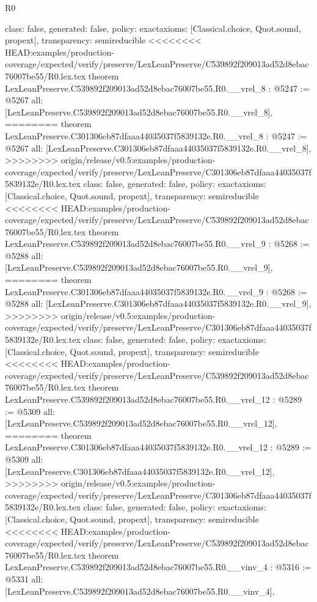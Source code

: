 \begin{lexlean}{R0}
\begin{coremodule}
{{{{{{{{{{{{{{{{{{{{{{{{{{{{{{{{{{{{{{{{{{{{{{{{{{{{{{{{{{{{{{{{{{{{{{{  class: false,
  generated: false,
  policy: exact{axioms: [Classical.choice, Quot.sound, propext]},
  transparency: semireducible
}
<<<<<<<< HEAD:examples/production-coverage/expected/verify/preserve/LexLeanPreserve/C539892f209013ad52d8ebac76007be55/R0.lex.tex
theorem LexLeanPreserve.C539892f209013ad52d8ebac76007be55.R0.__vrel_8 : @5247 := @5267 {
  all: [LexLeanPreserve.C539892f209013ad52d8ebac76007be55.R0.__vrel_8],
========
theorem LexLeanPreserve.C301306eb87dfaaa44035037f5839132e.R0.__vrel_8 : @5247 := @5267 {
  all: [LexLeanPreserve.C301306eb87dfaaa44035037f5839132e.R0.__vrel_8],
>>>>>>>> origin/release/v0.5:examples/production-coverage/expected/verify/preserve/LexLeanPreserve/C301306eb87dfaaa44035037f5839132e/R0.lex.tex
  class: false,
  generated: false,
  policy: exact{axioms: [Classical.choice, Quot.sound, propext]},
  transparency: semireducible
}
<<<<<<<< HEAD:examples/production-coverage/expected/verify/preserve/LexLeanPreserve/C539892f209013ad52d8ebac76007be55/R0.lex.tex
theorem LexLeanPreserve.C539892f209013ad52d8ebac76007be55.R0.__vrel_9 : @5268 := @5288 {
  all: [LexLeanPreserve.C539892f209013ad52d8ebac76007be55.R0.__vrel_9],
========
theorem LexLeanPreserve.C301306eb87dfaaa44035037f5839132e.R0.__vrel_9 : @5268 := @5288 {
  all: [LexLeanPreserve.C301306eb87dfaaa44035037f5839132e.R0.__vrel_9],
>>>>>>>> origin/release/v0.5:examples/production-coverage/expected/verify/preserve/LexLeanPreserve/C301306eb87dfaaa44035037f5839132e/R0.lex.tex
  class: false,
  generated: false,
  policy: exact{axioms: [Classical.choice, Quot.sound, propext]},
  transparency: semireducible
}
<<<<<<<< HEAD:examples/production-coverage/expected/verify/preserve/LexLeanPreserve/C539892f209013ad52d8ebac76007be55/R0.lex.tex
theorem LexLeanPreserve.C539892f209013ad52d8ebac76007be55.R0.__vrel_12 : @5289 := @5309 {
  all: [LexLeanPreserve.C539892f209013ad52d8ebac76007be55.R0.__vrel_12],
========
theorem LexLeanPreserve.C301306eb87dfaaa44035037f5839132e.R0.__vrel_12 : @5289 := @5309 {
  all: [LexLeanPreserve.C301306eb87dfaaa44035037f5839132e.R0.__vrel_12],
>>>>>>>> origin/release/v0.5:examples/production-coverage/expected/verify/preserve/LexLeanPreserve/C301306eb87dfaaa44035037f5839132e/R0.lex.tex
  class: false,
  generated: false,
  policy: exact{axioms: [Classical.choice, Quot.sound, propext]},
  transparency: semireducible
}
<<<<<<<< HEAD:examples/production-coverage/expected/verify/preserve/LexLeanPreserve/C539892f209013ad52d8ebac76007be55/R0.lex.tex
theorem LexLeanPreserve.C539892f209013ad52d8ebac76007be55.R0.__vinv_4 : @5316 := @5331 {
  all: [LexLeanPreserve.C539892f209013ad52d8ebac76007be55.R0.__vinv_4],
}}}}}}}}}}}}}}}}}}}}}}}}}}}}}}}}}}}}}}}}}}}}}}}}}}}}}}}}}}}}}}}}}}}}}}}}}}
\end{coremodule}
\end{lexlean}
